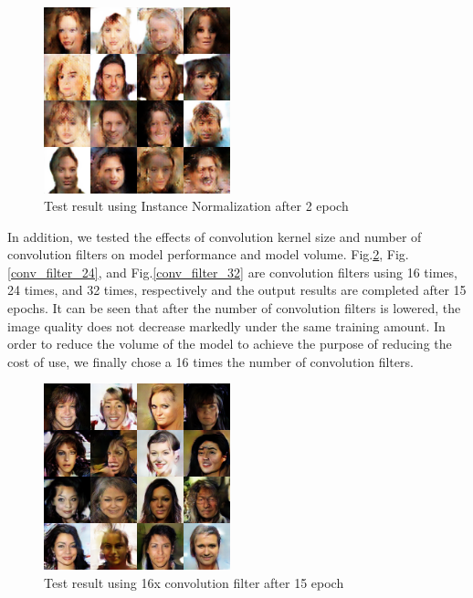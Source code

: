 \begin{figure}
    \begin{center}
    \includegraphics[width=0.48\textwidth]{figures/result_norm_instance.png}
    \caption{Test result using Instance Normalization after 2 epoch}
    \label{norm_instance}
    \end{center}
\end{figure}

In addition, we tested the effects of convolution kernel size and number of convolution filters on model performance and model volume.
Fig.\ref{conv_filter_16}, Fig.\ref{conv_filter_24}, and Fig.\ref{conv_filter_32} are convolution filters using 16 times, 24 times, and 32 times, respectively and the output results are completed after 15 epochs.
It can be seen that after the number of convolution filters is lowered, the image quality does not decrease markedly under the same training amount.
In order to reduce the volume of the model to achieve the purpose of reducing the cost of use, we finally chose a 16 times the number of convolution filters.

\begin{figure}
    \begin{center}
    \includegraphics[width=0.48\textwidth]{figures/result_conv_filter_16.png}
    \caption{Test result using 16x convolution filter after 15 epoch}
    \label{conv_filter_16}
    \end{center}
\end{figure}

